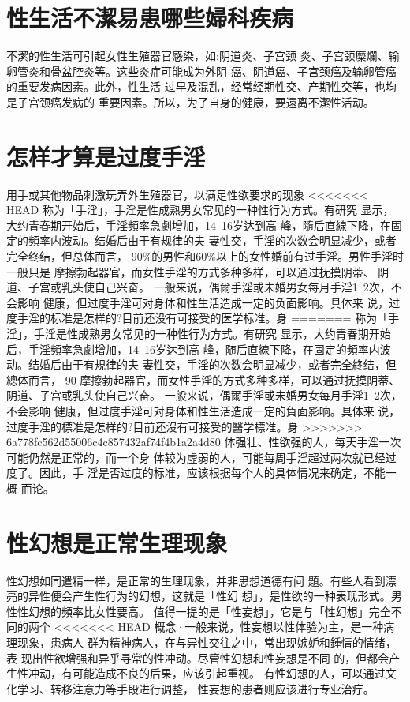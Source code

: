\documentclass[12pt,UTF8]{ctexbook}
\begin{document}
\section{性生活不潔易患哪些婦科疾病}

不潔的性生活可引起女性生殖器官感染，如:阴道炎、子宫颈
炎、子宫颈糜爛、输卵管炎和骨盆腔炎等。这些炎症可能成为外阴
癌、阴道癌、子宫颈癌及输卵管癌的重要发病因素。此外，性生活
过早及混乱，经常经期性交、产期性交等，也均是子宫颈癌发病的
重要因素。所以，为了自身的健康，要遠离不潔性活动。

\section{怎样才算是过度手淫}

用手或其他物品刺激玩弄外生殖器官，以满足性欲要求的现象
<<<<<<< HEAD
称为「手淫」，手淫是性成熟男女常见的一种性行为方式。有研究
显示，大约青春期开始后，手淫頻率急劇增加，14~16岁达到高
峰，隨后直線下降，在固定的頻率内波动。结婚后由于有规律的夫
妻性交，手淫的次数会明显减少，或者完全终结，但总体而言，
90\%的男性和60\%以上的女性婚前有过手淫。男性手淫时一般只是
摩擦勃起器官，而女性手淫的方式多种多样，可以通过抚摸阴蒂、
阴道、子宫或乳头使自己兴奋。
一般来说，偶爾手淫或未婚男女每月手淫1~2次，不会影响
健康，但过度手淫可对身体和性生活造成一定的负面影响。具体来
说，过度手淫的标准是怎样的?目前还没有可接受的医学标准。身
=======
称为「手淫」，手淫是性成熟男女常见的一种性行为方式。有研究
显示，大约青春期开始后，手淫頻率急劇增加，14~16岁达到高
峰，随后直線下降，在固定的頻率内波动。结婚后由于有規律的夫
妻性交，手淫的次数会明显减少，或者完全終结，但總体而言，
90%
摩擦勃起器官，而女性手淫的方式多种多样，可以通过抚摸阴蒂、
阴道、子宫或乳头使自己兴奋。
一般来说，偶爾手淫或未婚男女每月手淫1~2次，不会影响
健康，但过度手淫可对身体和性生活造成一定的負面影响。具体来
说，过度手淫的標准是怎样的?目前还沒有可接受的醫学標准。身
>>>>>>> 6a778fc562d55006c4c857432af74f4b1a2a4d80
体强壮、性欲强的人，每天手淫一次可能仍然是正常的，而一个身
体较为虛弱的人，可能每周手淫超过两次就已经过度了。因此，手
淫是否过度的标准，应该根据每个人的具体情况来确定，不能一概
而论。
\section{性幻想是正常生理现象}
性幻想如同遣精一样，是正常的生理现象，并非思想道德有问
題。有些人看到漂亮的异性便会产生性行为的幻想，这就是「性幻
想」，是性欲的一种表现形式。男性性幻想的頻率比女性要高。
值得一提的是「性妄想」，它是与「性幻想」完全不同的两个
<<<<<<< HEAD
概念·一般来说，性妄想以性体验为主，是一种病理现象，患病人
群为精神病人，在与异性交往之中，常出现嫉妒和鍾情的情绪，表
现出性欲增强和异乎寻常的性冲动。尽管性幻想和性妄想是不同
的，但都会产生性冲动，有可能造成不良的后果，应该引起重视。
有性幻想的人，可以通过文化学习、转移注意力等手段进行调整，
性妄想的患者则应该进行专业治疗。
\end{document}
